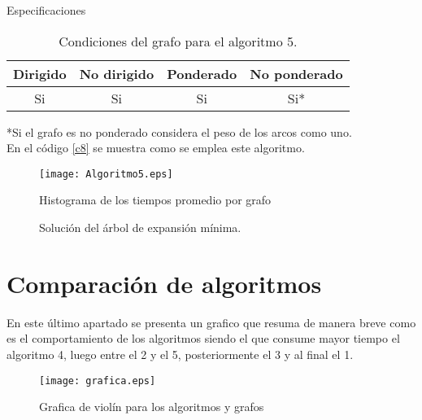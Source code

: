\documentclass[12pt]{article}
\begin{document}
Especificaciones

\begin{table}[H] 
\caption{{\small Condiciones del grafo para el algoritmo 5.}}
\begin{center}
\begin{tabular}{|c|c|c|c|}
\hline
Dirigido & No dirigido & Ponderado & No ponderado \\ \hline
Si       & Si          & Si        & Si*        \\  \hline
\end{tabular}
\label{cua5}
\end{center}
\end{table}

*{\small Si el grafo es no ponderado considera el peso de los arcos como uno.}  \\

En el código \ref{c8} se muestra como se emplea este algoritmo.

 \label{c8}


\begin{figure}[H]
\begin{center}
	\texttt{[image: Algoritmo5.eps]}
\end{center}
\vspace{-.3cm}
\caption{{\small Histograma de los tiempos promedio por grafo}}
\end{figure}


\begin{figure}[H]
\centering
{}\hspace{5mm}
\vspace{10mm}
\hspace{10mm}
\vspace{10mm}
\caption{Solución del árbol de expansión mínima.} \label{g5}
\end{figure}

\newpage
\section{Comparación de algoritmos}
En este último apartado se presenta un grafico que resuma de manera breve como es el comportamiento de los algoritmos
siendo el que consume mayor tiempo el algoritmo 4, luego entre el 2 y el 5, posteriormente el 3 y al final el 1.

\begin{figure}[H]
\begin{center}
	\texttt{[image: grafica.eps]}
\end{center}
\vspace{-1.5cm}
\caption{{\small Grafica de violín para los algoritmos y grafos}}
\end{figure}


\newpage


\end{document}
